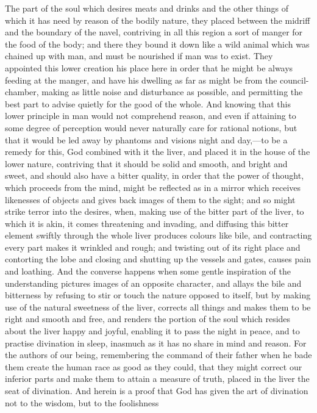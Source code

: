 The part of the soul which desires meats and drinks and the other things
of which it has need by reason of the bodily nature, they placed between
the midriff and the boundary of the navel, contriving in all this region a
sort of manger for the food of the body; and there they bound it down like
a wild animal which was chained up with man, and must be nourished if man
was to exist. They appointed this lower creation his place here in order
that he might be always feeding at the manger, and have his dwelling as
far as might be from the council-chamber, making as little noise and
disturbance as possible, and permitting the best part to advise quietly
for the good of the whole. And knowing that this lower principle in man
would not comprehend reason, and even if attaining to some degree of
perception would never naturally care for rational notions, but that it
would be led away by phantoms and visions night and day,—to be a
remedy for this, God combined with it the liver, and placed it in the
house of the lower nature, contriving that it should be solid and smooth,
and bright and sweet, and should also have a bitter quality, in order that
the power of thought, which proceeds from the mind, might be reflected as
in a mirror which receives likenesses of objects and gives back images of
them to the sight; and so might strike terror into the desires, when,
making use of the bitter part of the liver, to which it is akin, it comes
threatening and invading, and diffusing this bitter element swiftly
through the whole liver produces colours like bile, and contracting every
part makes it wrinkled and rough; and twisting out of its right place and
contorting the lobe and closing and shutting up the vessels and gates,
causes pain and loathing. And the converse happens when some gentle
inspiration of the understanding pictures images of an opposite character,
and allays the bile and bitterness by refusing to stir or touch the nature
opposed to itself, but by making use of the natural sweetness of the
liver, corrects all things and makes them to be right and smooth and free,
and renders the portion of the soul which resides about the liver happy
and joyful, enabling it to pass the night in peace, and to practise
divination in sleep, inasmuch as it has no share in mind and reason. For
the authors of our being, remembering the command of their father when he
bade them create the human race as good as they could, that they might
correct our inferior parts and make them to attain a measure of truth,
placed in the liver the seat of divination. And herein is a proof that God
has given the art of divination not to the wisdom, but to the foolishness
